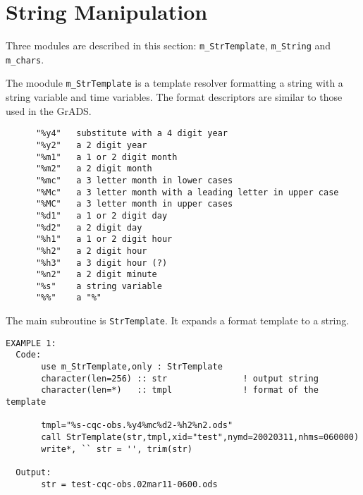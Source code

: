 %  
%  
%  
\section{String Manipulation}
%
Three modules are described in this section: {\tt m\_StrTemplate},
{\tt m\_String} and {\tt m\_chars}.

\noindent
The moodule {\tt m\_StrTemplate} is a template resolver formatting a 
string with a string variable and time variables.  
The format descriptors are similar to those used in the GrADS.
%
\begin{verbatim}
      "%y4"   substitute with a 4 digit year
      "%y2"   a 2 digit year
      "%m1"   a 1 or 2 digit month
      "%m2"   a 2 digit month
      "%mc"   a 3 letter month in lower cases
      "%Mc"   a 3 letter month with a leading letter in upper case
      "%MC"   a 3 letter month in upper cases
      "%d1"   a 1 or 2 digit day
      "%d2"   a 2 digit day
      "%h1"   a 1 or 2 digit hour
      "%h2"   a 2 digit hour
      "%h3"   a 3 digit hour (?)
      "%n2"   a 2 digit minute
      "%s"    a string variable
      "%%"    a "%"
\end{verbatim}
%
The main subroutine is {\tt StrTemplate}. It expands a format template 
to a string.
%
\begin{verbatim}
EXAMPLE 1:
  Code:
       use m_StrTemplate,only : StrTemplate
       character(len=256) :: str               ! output string
       character(len=*)   :: tmpl              ! format of the template
     
       tmpl="%s-cqc-obs.%y4%mc%d2-%h2%n2.ods"
       call StrTemplate(str,tmpl,xid="test",nymd=20020311,nhms=060000)
       write*, `` str = '', trim(str)

  Output:
       str = test-cqc-obs.02mar11-0600.ods
\end{verbatim}

